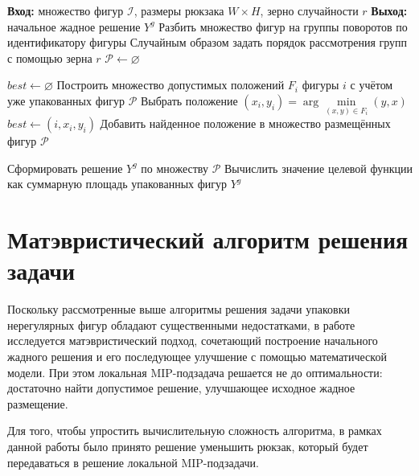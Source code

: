 \documentclass[a4paper]{article}
\begin{document}
    \begin{algorithm}[tbp]
    \caption{Рандомизированный жадный алгоритм}
    \label{alg:greedy_random_short}
    \small
    \begin{algorithmic}[1]
    \State \textbf{Вход:} множество фигур $\mathcal{I}$, размеры рюкзака $W \times H$, зерно случайности $r$
    \State \textbf{Выход:} начальное жадное решение $Y^g$
    \State Разбить множество фигур на группы поворотов по идентификатору фигуры
    \State Случайным образом задать порядок рассмотрения групп с помощью зерна $r$
    \State $\mathcal{P} \gets \varnothing$

        \State $best \gets \varnothing$
            \State Построить множество допустимых положений $F_i$ фигуры $i$ с учётом уже упакованных фигур $\mathcal{P}$
                \State Выбрать положение $(x_i, y_i) = \arg \min\limits_{(x,y) \in F_i}(y, x)$
                    \State $best \gets (i, x_i, y_i)$
                \EndIf
            \EndIf
        \EndFor
            \State Добавить найденное положение в множество размещённых фигур $\mathcal{P}$
        \EndIf
    \EndFor

    \State Сформировать решение $Y^g$ по множеству $\mathcal{P}$
    \State Вычислить значение целевой функции как суммарную площадь упакованных фигур
    \State \Return $Y^g$
    \end{algorithmic}
    \end{algorithm}
    

    \newpage

    \section{Матэвристический алгоритм решения задачи}

    Поскольку рассмотренные выше алгоритмы решения задачи упаковки нерегулярных фигур обладают существенными недостатками, в работе исследуется матэвристический подход, сочетающий построение начального жадного решения и его последующее улучшение с помощью математической модели. При этом локальная MIP-подзадача решается не до оптимальности: достаточно найти допустимое решение, улучшающее исходное жадное размещение.

    Для того, чтобы упростить вычислительную сложность алгоритма, в рамках данной работы было принято решение уменьшить рюкзак, который будет передаваться в решение локальной MIP-подзадачи.
\end{document}
